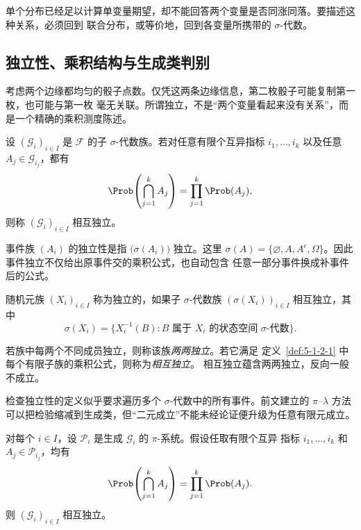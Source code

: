单个分布已经足以计算单变量期望，却不能回答两个变量是否同涨同落。要描述这种关系，必须回到
联合分布，或等价地，回到各变量所携带的 $\sigma$-代数。


\subsection{独立性、乘积结构与生成类判别}\label{subsec:5-1-2}

考虑两个边缘都均匀的骰子点数。仅凭这两条边缘信息，第二枚骰子可能复制第一枚，也可能与第一枚
毫无关联。所谓独立，不是“两个变量看起来没有关系”，而是一个精确的乘积测度陈述。

\begin{definition}[独立 $\sigma$-代数]\label{def:5-1-2-1}
设 $(\mathcal G_i)_{i\in I}$ 是 $\mathcal F$ 的子 $\sigma$-代数族。若对任意有限个互异指标
$i_1,\ldots,i_k$ 以及任意 $A_j\in\mathcal G_{i_j}$，都有
\[
 \Prob\!\left(\bigcap_{j=1}^k A_j\right)
 =\prod_{j=1}^k\Prob(A_j),
\]
则称 $(\mathcal G_i)_{i\in I}$ 相互独立。
\end{definition}

事件族 $(A_i)$ 的独立性是指 $\bigl(\sigma(A_i)\bigr)$ 独立。这里
$\sigma(A)=\{\varnothing,A,A^c,\Omega\}$。因此事件独立不仅给出原事件交的乘积公式，也自动包含
任意一部分事件换成补事件后的公式。

\begin{definition}[随机元的独立性]\label{def:5-1-2-2}
随机元族 $(X_i)_{i\in I}$ 称为独立的，如果子 $\sigma$-代数族
$(\sigma(X_i))_{i\in I}$ 相互独立，其中
\[
 \sigma(X_i)=\{X_i^{-1}(B):B\text{ 属于 }X_i\text{ 的状态空间 }\sigma\text{-代数}\}.
\]
\end{definition}

\begin{definition}[两两独立与相互独立]\label{def:5-1-2-3}
若族中每两个不同成员独立，则称该族\emph{两两独立}。若它满足
定义~\ref{def:5-1-2-1} 中每个有限子族的乘积公式，则称为\emph{相互独立}。
相互独立蕴含两两独立，反向一般不成立。
\end{definition}

检查独立性的定义似乎要求遍历多个 $\sigma$-代数中的所有事件。前文建立的
$\pi$--$\lambda$ 方法可以把检验缩减到生成类，但“二元成立”不能未经论证便升级为任意有限元成立。

\begin{theorem}[生成类独立判别]\label{theorem:5-1-2-1}
对每个 $i\in I$，设 $\mathcal P_i$ 是生成 $\mathcal G_i$ 的 $\pi$-系统。假设任取有限个互异
指标 $i_1,\ldots,i_k$ 和 $A_j\in\mathcal P_{i_j}$，均有
\[
 \Prob\!\left(\bigcap_{j=1}^kA_j\right)=\prod_{j=1}^k\Prob(A_j).
\]
则 $(\mathcal G_i)_{i\in I}$ 相互独立。
\end{theorem}


